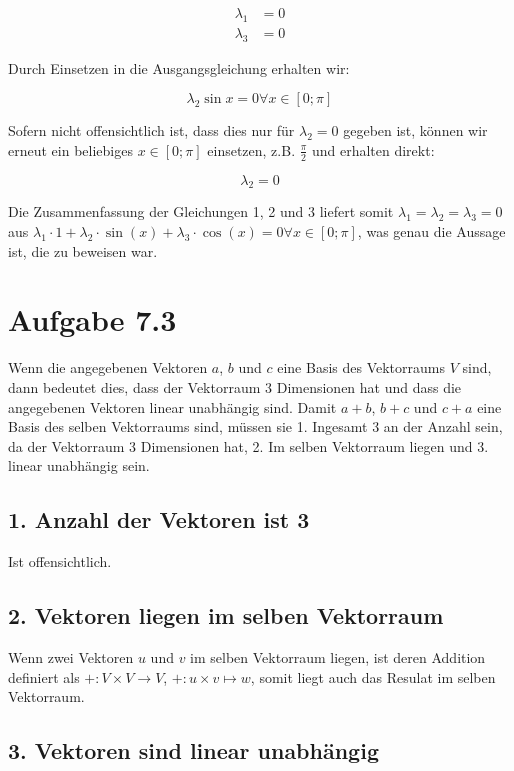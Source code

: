 \documentclass[a4paper,german,12pt,smallheadings]{scrartcl}
\begin{document}
\begin{align}
\lambda_1 &= 0 \\
\lambda_3 &= 0
\end{align}

Durch Einsetzen in die Ausgangsgleichung erhalten wir:

\begin{equation*}
  \lambda_2 \sin x = 0 \forall x \in [0;\pi]
\end{equation*}

Sofern nicht offensichtlich ist, dass dies nur für $\lambda_2 = 0$ gegeben ist,
können wir erneut ein beliebiges $x \in [0;\pi]$ einsetzen, z.B. $\frac{\pi}{2}$
und erhalten direkt:

\begin{equation}
  \lambda_2 = 0
\end{equation}

Die Zusammenfassung der Gleichungen 1, 2 und 3 liefert somit $\lambda_1 =
\lambda_2 = \lambda_3 = 0$ aus $\lambda_1 \cdot 1 + \lambda_2 \cdot \sin(x) +
\lambda_3 \cdot \cos(x) = 0 \forall x \in [0;\pi]$, was genau die Aussage ist,
die zu beweisen war.

\section*{Aufgabe 7.3}

Wenn die angegebenen Vektoren $a$, $b$ und $c$ eine Basis des Vektorraums $V$
sind, dann bedeutet dies, dass der Vektorraum 3 Dimensionen hat und dass die
angegebenen Vektoren linear unabhängig sind. Damit $a+b$, $b+c$ und $c+a$ eine
Basis des selben Vektorraums sind, müssen sie 1. Ingesamt 3 an der Anzahl sein,
da der Vektorraum 3 Dimensionen hat, 2. Im selben Vektorraum liegen und 3.
linear unabhängig sein.

\subsection*{1. Anzahl der Vektoren ist 3}
Ist offensichtlich.

\subsection*{2. Vektoren liegen im selben Vektorraum}
Wenn zwei Vektoren $u$ und $v$ im selben Vektorraum liegen, ist deren Addition
definiert als $+: V \times V \to V$, $+: u \times v \mapsto w$, somit liegt
auch das Resulat im selben Vektorraum.

\subsection*{3. Vektoren sind linear unabhängig}
\end{document}
